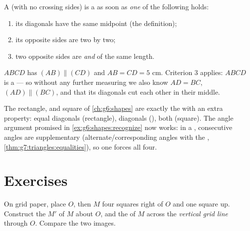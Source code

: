 \begin{theorem}\label{thm:g7:central:recognize}
A  (with no crossing sides) is a  as soon as
\emph{one} of the following holds:
\begin{enumerate}
  \item its diagonals have the same midpoint (the definition);
  \item its opposite sides are  two by two;
  \item two opposite sides are  \emph{and} of the same length.
\end{enumerate}
\end{theorem}
\admitted

\begin{example}\label{ex:g7:central:recognize}
$ABCD$ has $(AB) \parallel (CD)$ and $AB = CD = 5$ cm. Criterion 3
applies: $ABCD$ is a  --- so without any further
measuring we also know $AD = BC$, $(AD) \parallel (BC)$, and that its
diagonals cut each other in their middle.
\end{example}

\begin{remark}
The rectangle,  and square of \cref{ch:g6:shapes} are exactly
the  with an extra property: equal diagonals
(rectangle),  diagonals (), both (square). The
angle argument promised in \cref{ex:g6:shapes:recognize} now works:
in a , consecutive angles are supplementary
(alternate/corresponding angles with the ,
\cref{thm:g7:triangles:equalities}), so one  forces all
four.
\end{remark}

\section{Exercises}

\begin{exercise}[$\star$]\label{exo:g7:central:1}
On grid paper, place $O$, then $M$ four squares right of $O$ and one
square up. Construct the  $M'$ of $M$ about $O$, and the
 of $M$ across the \emph{vertical grid line} through $O$.
Compare the two images.
\end{exercise}

